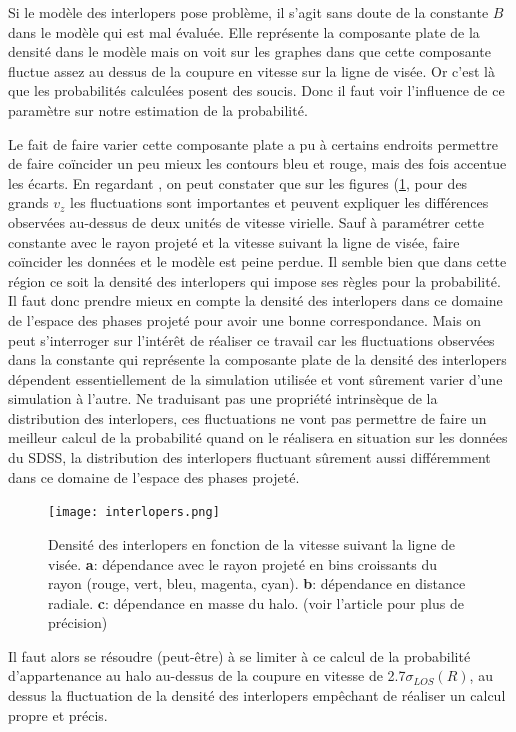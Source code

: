 Si le modèle des interlopers pose problème, il s'agit sans doute de la constante $B$ dans le modèle qui est mal évaluée. Elle
représente la composante plate de la densité dans le modèle mais on voit sur les graphes dans \citet{MBM10} que cette composante
fluctue assez au dessus de la coupure en vitesse sur la ligne de visée. Or c'est là que les probabilités calculées posent des
soucis. Donc il faut voir l'influence de ce paramètre sur notre estimation de la probabilité.

Le fait de faire varier cette composante plate a pu à certains endroits permettre de faire coïncider un peu mieux les contours bleu
et rouge, mais des fois accentue les écarts. En regardant \citet{MBM10}, on peut constater que sur les figures
(\ref{fig:interlopers}, pour des grands $v_z$ les fluctuations sont importantes et peuvent expliquer les différences observées
au-dessus de deux unités de vitesse virielle. Sauf à paramétrer cette constante avec le rayon projeté et la vitesse suivant la
ligne de visée, faire coïncider les données et le modèle est peine perdue. Il semble bien que dans cette région ce soit la densité
des interlopers qui impose ses règles pour la probabilité. Il faut donc prendre mieux en compte la densité des interlopers dans ce
domaine de l'espace des phases projeté pour avoir une bonne correspondance. Mais on peut s'interroger sur l'intérêt de réaliser ce
travail car les fluctuations observées dans la constante qui représente la composante plate de la densité des interlopers dépendent
essentiellement de la simulation utilisée et vont sûrement varier d'une simulation à l'autre. Ne traduisant pas une propriété
intrinsèque de la distribution des interlopers, ces fluctuations ne vont pas permettre de faire un meilleur calcul de la
probabilité quand on le réalisera en situation sur les données du SDSS, la distribution des interlopers fluctuant sûrement aussi
différemment dans ce domaine de l'espace des phases projeté.
\begin{figure}[htb]
	\centering
	\texttt{[image: interlopers.png]}
	\caption{\footnotesize{}Densité des interlopers en fonction de la vitesse suivant la ligne de visée. {\bfseries{a}}:
	dépendance avec le rayon projeté en bins croissants du rayon (rouge, vert, bleu, magenta, cyan). {\bfseries{b}}: dépendance
	en distance radiale. {\bfseries{c}}: dépendance en masse du halo. (voir l'article pour plus de précision)}
	\label{fig:interlopers}
\end{figure}

Il faut alors se résoudre (peut-être) à se limiter à ce calcul de la probabilité d'appartenance au halo au-dessus de la coupure en
vitesse de \num{2.7}$\sigma_{LOS}{(R)}$, au dessus la fluctuation de la densité des interlopers empêchant de réaliser un calcul
propre et précis.

